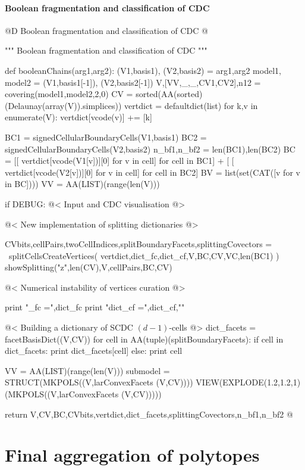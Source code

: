 \documentclass[11pt,oneside]{article}	%
\begin{document}
\paragraph{Boolean fragmentation and classification of CDC}

@D Boolean fragmentation and classification of CDC
@{""" Boolean fragmentation and classification of CDC """

def booleanChains(arg1,arg2):
	(V1,basis1), (V2,basis2) = arg1,arg2
	model1, model2 = (V1,basis1[-1]), (V2,basis2[-1])
	V,[VV,_,_,CV1,CV2],n12 = covering(model1,model2,2,0)
	CV = sorted(AA(sorted)(Delaunay(array(V)).simplices))
	vertdict = defaultdict(list)
	for k,v in enumerate(V): vertdict[vcode(v)] += [k]
	
	BC1 = signedCellularBoundaryCells(V1,basis1)
	BC2 = signedCellularBoundaryCells(V2,basis2)
	n_bf1,n_bf2 = len(BC1),len(BC2)
	BC = [[ vertdict[vcode(V1[v])][0] for v in cell] for cell in BC1] + [ 
			[ vertdict[vcode(V2[v])][0] for v in cell] for cell in BC2]
	BV = list(set(CAT([v for v in BC])))
	VV = AA(LIST)(range(len(V)))
	
	if DEBUG: 
		@< Input and CDC visualisation @>
		
	@< New implementation of splitting dictionaries @>
	
	CVbits,cellPairs,twoCellIndices,splitBoundaryFacets,splittingCovectors = \
		splitCellsCreateVertices( vertdict,dict_fc,dict_cf,V,BC,CV,VC,len(BC1) )
	showSplitting("z",len(CV),V,cellPairs,BC,CV)
	
	@< Numerical instability of vertices curation @>

	print "\ndict_fc =",dict_fc
	print "dict_cf =",dict_cf,"\n"

	@< Building a dictionary of SCDC $(d-1)$-cells @>
	dict_facets = facetBasisDict((V,CV))
	for cell in AA(tuple)(splitBoundaryFacets): 
		if cell in dict_facets:
			print dict_facets[cell]
		else: print cell
		
	VV = AA(LIST)(range(len(V)))	
	submodel = STRUCT(MKPOLS((V,larConvexFacets (V,CV))))
	VIEW(EXPLODE(1.2,1.2,1)(MKPOLS((V,larConvexFacets (V,CV)))))
	
	return V,CV,BC,CVbits,vertdict,dict_facets,splittingCovectors,n_bf1,n_bf2
@}




\section{Final aggregation of polytopes}
\end{document}
